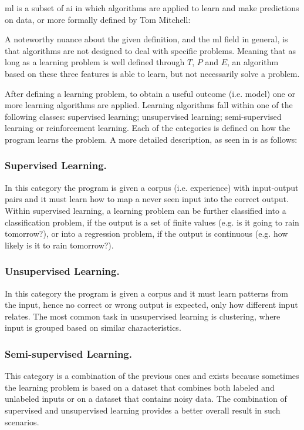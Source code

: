 \documentclass{llncs}
\begin{document}
\gls{ml} is a subset of \gls{ai} in which algorithms are applied to learn and make predictions on data, or more formally defined by Tom Mitchell\cite{mitchell:ml}:\\

A noteworthy nuance about the given definition, and the \gls{ml} field in general, is that algorithms are not designed to deal with specific problems. Meaning that as long as a learning problem is well defined through $T$, $P$ and $E$, an algorithm based on these three features is able to learn, but not necessarily solve a problem.

After defining a learning problem, to obtain a useful outcome (i.e. model) one or more learning algorithms are applied. Learning algorithms fall within one of the following classes: supervised learning; unsupervised learning; semi-supervised learning or reinforcement learning. Each of the categories is defined on how the program learns the problem. A more detailed description, as seen in \cite{norvig:ai} is as follows:

\subsubsection{Supervised Learning.} In this category the program is given a corpus (i.e. experience) with input-output pairs and it must learn how to map a never seen input into the correct output. Within supervised learning, a learning problem can be further classified into a classification problem, if the output is a set of finite values (e.g. is it going to rain tomorrow?), or into a regression problem, if the output is continuous (e.g. how likely is it to rain tomorrow?).

\subsubsection{Unsupervised Learning.} In this category the program is given a corpus and it must learn patterns from the input, hence no correct or wrong output is expected, only how different input relates. The most common task in unsupervised learning is clustering, where input is grouped based on similar characteristics.

\subsubsection{Semi-supervised Learning.} This category is a combination of the previous ones and exists because sometimes the learning problem is based on a dataset that combines both labeled and unlabeled inputs or on a dataset that contains noisy data. The combination of supervised and unsupervised learning provides a better overall result in such scenarios.
\end{document}
